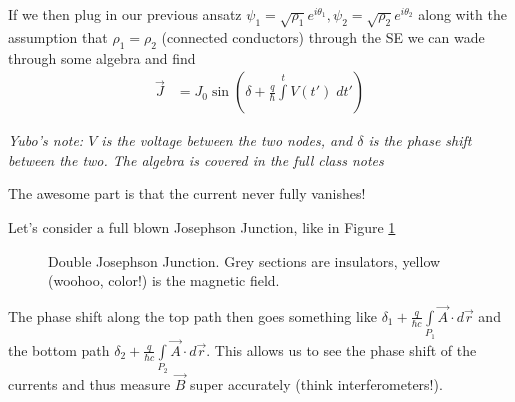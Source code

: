 \documentclass[12pt]{article}
\begin{document}
If we then plug in our previous ansatz $\psi_1 = \sqrt{\rho_1}e^{i\theta_1}, \psi_2 = \sqrt{\rho_2}e^{i\theta_2}$ along with the assumption that $\rho_1 = \rho_2$ (connected conductors) through the SE we can wade through some algebra and find
\begin{align}
    \vec{J} &= J_0\sin\left( \delta + \frac{q}{\hbar}\int\limits_{}^{t}V(t')\;dt' \right)
\end{align}

{\em Yubo's note: $V$ is the voltage between the two nodes, and $\delta$ is the phase shift between the two. The algebra is covered in the full class notes}

The awesome part is that the current never fully vanishes!

Let's consider a full blown Josephson Junction, like in Figure \ref{JJ2}
\begin{figure}[!h]
    \centering
    \caption{Double Josephson Junction. Grey sections are insulators, yellow (woohoo, color!) is the magnetic field.}
    \label{JJ2}
\end{figure}

The phase shift along the top path then goes something like $\delta_1 + \frac{q}{\hbar c}\int\limits_{P_1} \vec{A} \cdot d\vec{r}$ and the bottom path $\delta_2 + \frac{q}{\hbar c}\int \limits_{P_2}\vec{A} \cdot d\vec{r}$. This allows us to see the phase shift of the currents and thus measure $\vec{B}$ super accurately (think interferometers!).
\end{document}
